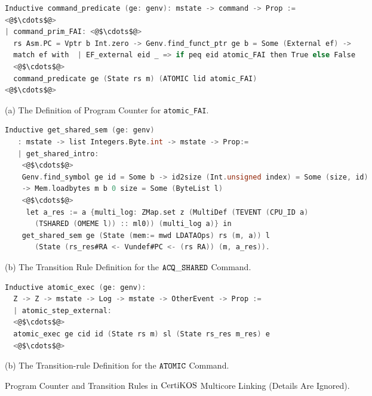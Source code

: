 \begin{figure}
\begin{lstlisting}[language=C]
Inductive command_predicate (ge: genv): mstate -> command -> Prop :=
<@$\cdots$@>
| command_prim_FAI: <@$\cdots$@>
  rs Asm.PC = Vptr b Int.zero -> Genv.find_funct_ptr ge b = Some (External ef) ->
  match ef with  | EF_external eid _ => if peq eid atomic_FAI then True else False
  <@$\cdots$@>
  command_predicate ge (State rs m) (ATOMIC lid atomic_FAI) 
<@$\cdots$@>
\end{lstlisting}
\begin{center}
(a) The Definition of Program Counter for \lstinline$atomic_FAI$.
\end{center}
\begin{lstlisting}[language=C, deletekeywords={int, unsigned}]
 Inductive get_shared_sem (ge: genv) 
   : mstate -> list Integers.Byte.int -> mstate -> Prop:=
   | get_shared_intro: 
    <@$\cdots$@>
    Genv.find_symbol ge id = Some b -> id2size (Int.unsigned index) = Some (size, id)
    -> Mem.loadbytes m b 0 size = Some (ByteList l)
    <@$\cdots$@>
     let a_res := a {multi_log: ZMap.set z (MultiDef (TEVENT (CPU_ID a)
       (TSHARED (OMEME l)) :: ml0)) (multi_log a)} in
    get_shared_sem ge (State (mem:= mwd LDATAOps) rs (m, a)) l 
       (State (rs_res#RA <- Vundef#PC <- (rs RA)) (m, a_res)).
\end{lstlisting}
\begin{center}
(b) The Transition Rule Definition for the ${{\mathrm{\texttt{ACQ}}}\_{\mathrm{\texttt{SHARED}}}}$ Command.
\end{center}
\begin{lstlisting}[language=C]
Inductive atomic_exec (ge: genv):
  Z -> Z -> mstate -> Log -> mstate -> OtherEvent -> Prop :=
  | atomic_step_external:
  <@$\cdots$@>
  atomic_exec ge cid id (State rs m) sl (State rs_res m_res) e
  <@$\cdots$@>
\end{lstlisting}
\begin{center}
(b) The  Transition-rule Definition for the ${{\mathrm{\texttt{ATOMIC}}}}$ Command.
\end{center}
\caption{Program Counter and Transition Rules in $\mathrm{CertiKOS}$ Multicore Linking (Details Are Ignored).}
\label{fig:chapter:certikos:definitions-for-hw-abstract-semantics}
\end{figure}

